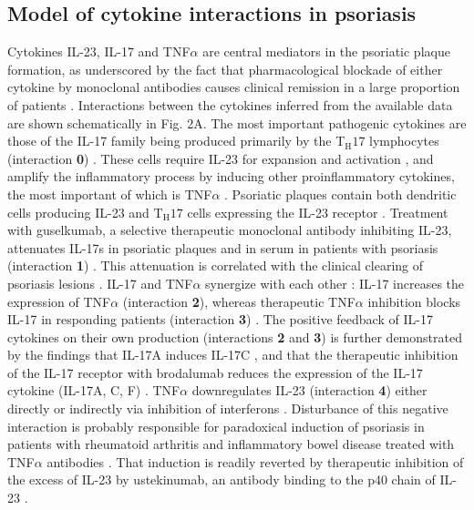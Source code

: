 \subsection{Model of cytokine interactions in psoriasis}
Cytokines IL-23, IL-17 and TNF$\alpha$ are central mediators in the psoriatic plaque formation, as underscored by the fact that pharmacological blockade of either cytokine by monoclonal antibodies causes clinical remission in a large proportion of patients \citep{jabbar2017}. Interactions between the cytokines inferred from the available data are shown schematically in Fig. 2A. The most important pathogenic cytokines are those of the IL-17 family being produced primarily by the T$_{\text{H}}17$ lymphocytes (interaction \textbf{0}) \citep{krueger2012}. These cells require IL-23 for expansion and activation \citep{cosmi2008, wilson2007, zheng2007}, and amplify the inflammatory process by inducing other proinflammatory cytokines, the most important of which is TNF$\alpha$ \citep{boehncke2015}. Psoriatic plaques contain both dendritic cells producing IL-23 and T$_{\text{H}}17$ cells expressing the IL-23 receptor \citep{cosmi2008, lee2004, tillack2014, wilson2007}. Treatment with guselkumab, a selective therapeutic monoclonal antibody inhibiting IL-23, attenuates IL-17s in psoriatic plaques and in serum in patients with psoriasis (interaction \textbf{1}) \citep{hawkes2018,sofen2014,tillack2014}. This attenuation is correlated with the clinical clearing of psoriasis lesions \citep{sofen2014}. IL-17 and TNF$\alpha$ synergize with each other \citep{alzabin2012, krueger2012, xu2017}: IL-17 increases the expression of TNF$\alpha$ \citep{jovanovic1998} (interaction \textbf{2}), whereas therapeutic TNF$\alpha$ inhibition blocks IL-17 in responding patients (interaction \textbf{3}) \citep{zaba2007, zaba2009}. The positive feedback of IL-17 cytokines on their own production (interactions \textbf{2} and \textbf{3}) is further demonstrated by the findings that IL-17A induces IL-17C \citep{xu2018}, and that the therapeutic inhibition of the IL-17 receptor with brodalumab reduces the expression of the IL-17 cytokine (IL-17A, C, F) \citep{russell2014}. TNF$\alpha$ downregulates IL-23 (interaction \textbf{4}) either directly \citep{notley2008, zakharova2005} or indirectly via inhibition of interferons \citep{palucka2005, tillack2014}. Disturbance of this negative interaction is probably responsible for paradoxical induction of psoriasis in patients with rheumatoid arthritis and inflammatory bowel disease treated with TNF$\alpha$ antibodies \citep{palucka2005, tillack2014}. That induction is readily reverted by therapeutic inhibition of the excess of IL-23 by ustekinumab, an antibody binding to the p40 chain of IL-23 \citep{tillack2014}. 

